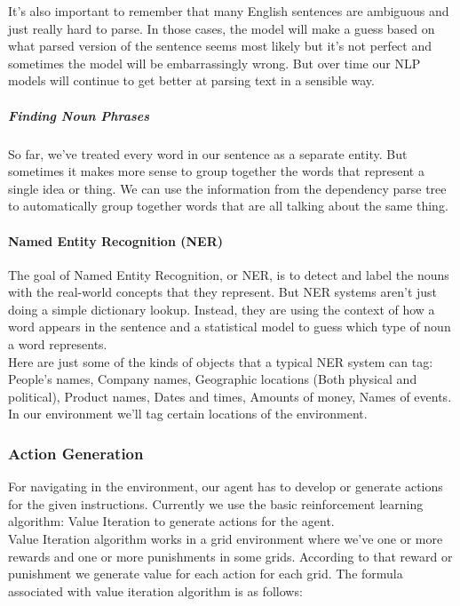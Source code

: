 It’s also important to remember that many English sentences are ambiguous and just really hard to parse. In those cases, the model will make a guess based on what parsed version of the sentence seems most likely but it’s not perfect and sometimes the model will be embarrassingly wrong. But over time our NLP models will continue to get better at parsing text in a sensible way.
\subparagraph{Finding Noun Phrases}
So far, we’ve treated every word in our sentence as a separate entity. But sometimes it makes more sense to group together the words that represent a single idea or thing. We can use the information from the dependency parse tree to automatically group together words that are all talking about the same thing.

\paragraph{Named Entity Recognition (NER)}
The goal of Named Entity Recognition, or NER, is to detect and label the nouns with the real-world concepts that they represent. But NER systems aren’t just doing a simple dictionary lookup. Instead, they are using the context of how a word appears in the sentence and a statistical model to guess which type of noun a word represents.\\

Here are just some of the kinds of objects that a typical NER system can tag: People’s names, Company names, Geographic locations (Both physical and political), Product names, Dates and times, Amounts of money, Names of events.\\
In our environment we'll tag certain locations of the environment.\\


\subsubsection{Action Generation}
For navigating in the environment, our agent has to develop or generate actions for the given instructions. Currently we use the basic reinforcement learning algorithm: Value Iteration to generate actions for the agent.\\

Value Iteration algorithm works in a grid environment where we've one or more rewards and one or more punishments in some grids. According to that reward or punishment we generate value for each action for each grid. The formula associated with value iteration algorithm is as follows:\\

